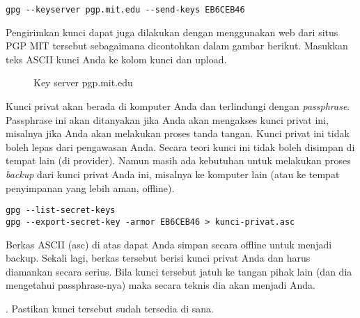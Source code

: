 \begin{verbatim}
gpg --keyserver pgp.mit.edu --send-keys EB6CEB46
\end{verbatim}

Pengirimkan kunci dapat juga dilakukan dengan menggunakan web dari situs PGP
MIT tersebut sebagaimana dicontohkan dalam gambar berikut. Masukkan teks ASCII
kunci Anda ke kolom kunci dan upload.

\begin{figure}[ht]
\caption{Key server pgp.mit.edu}
\label{fig:pgp-mit}
\end{figure}


Kunci privat akan berada di komputer Anda dan terlindungi dengan {\em passphrase}.
Passphrase ini akan ditanyakan jika Anda akan mengakses kunci privat ini,
misalnya jika Anda akan melakukan proses tanda tangan.
Kunci privat ini tidak boleh lepas dari pengawasan Anda. 
Secara teori kunci ini tidak boleh disimpan di tempat lain (di provider).
Namun masih ada kebutuhan untuk melakukan proses {\em backup} dari kunci privat
Anda ini, misalnya ke komputer lain (atau ke tempat penyimpanan yang lebih aman,
offline).

\begin{verbatim}
gpg --list-secret-keys
gpg --export-secret-key -armor EB6CEB46 > kunci-privat.asc
\end{verbatim}

Berkas ASCII (asc) di atas dapat Anda simpan secara offline untuk menjadi backup.
Sekali lagi, berkas tersebut berisi kunci privat Anda dan harus diamankan
secara serius.
Bila kunci tersebut jatuh ke tangan pihak lain (dan dia mengetahui passphrase-nya)
maka secara teknis dia akan menjadi Anda.


\begin{mdframed}[backgroundcolor=blue!20] 
\begin{ExerciseList}
   \Exercise[title=Membuat Kunci]
   . Pastikan kunci tersebut sudah
   tersedia di sana.
\end{ExerciseList}

\end{mdframed}


